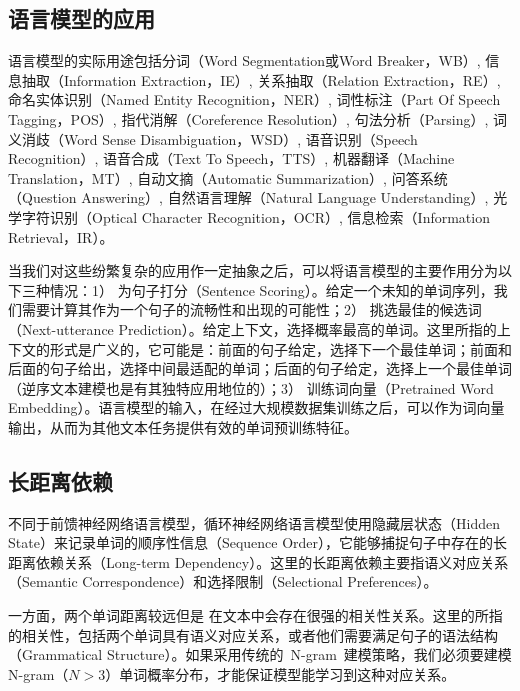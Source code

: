 \subsection{语言模型的应用}
语言模型的实际用途包括分词（Word Segmentation或Word Breaker，WB）, 信息抽取（Information Extraction，IE）, 关系抽取（Relation Extraction，RE）, 命名实体识别（Named Entity Recognition，NER）, 词性标注（Part Of Speech Tagging，POS）, 指代消解（Coreference Resolution）, 句法分析（Parsing）, 词义消歧（Word Sense Disambiguation，WSD）, 语音识别（Speech Recognition）, 语音合成（Text To Speech，TTS）, 机器翻译（Machine Translation，MT）, 自动文摘（Automatic Summarization）, 问答系统（Question Answering）, 自然语言理解（Natural Language Understanding）, 光学字符识别（Optical Character Recognition，OCR）, 信息检索（Information Retrieval，IR）。

当我们对这些纷繁复杂的应用作一定抽象之后，可以将语言模型的主要作用分为以下三种情况：1） 为句子打分（Sentence Scoring）。给定一个未知的单词序列，我们需要计算其作为一个句子的流畅性和出现的可能性；2） 挑选最佳的候选词（Next-utterance Prediction）。给定上下文，选择概率最高的单词。这里所指的上下文的形式是广义的，它可能是：前面的句子给定，选择下一个最佳单词；前面和后面的句子给出，选择中间最适配的单词；后面的句子给定，选择上一个最佳单词（逆序文本建模也是有其独特应用地位的）；3） 训练词向量（Pretrained Word Embedding）。语言模型的输入，在经过大规模数据集训练之后，可以作为词向量输出，从而为其他文本任务提供有效的单词预训练特征。

\subsection{长距离依赖}
不同于前馈神经网络语言模型，循环神经网络语言模型使用隐藏层状态（Hidden State）来记录单词的顺序性信息（Sequence Order），它能够捕捉句子中存在的长距离依赖关系（Long-term Dependency）。这里的长距离依赖主要指语义对应关系（Semantic Correspondence）和选择限制（Selectional Preferences）。

一方面，两个单词距离较远但是 在文本中会存在很强的相关性关系。这里的所指的相关性，包括两个单词具有语义对应关系，或者他们需要满足句子的语法结构（Grammatical Structure）。如果采用传统的~N-gram~建模策略，我们必须要建模N-gram（$N>3$）单词概率分布，才能保证模型能学习到这种对应关系。

